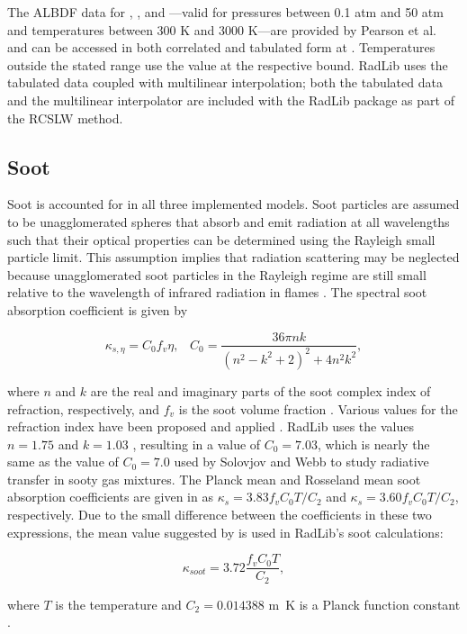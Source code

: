 \documentclass[preprint,12pt]{elsarticle}
\begin{document}
The ALBDF data for , , and ---valid for pressures between 0.1 atm and 50 atm and temperatures between 300 K and 3000 K---are provided by Pearson et al. \cite{Pearson_2014} and can be accessed in both correlated and tabulated form at \cite{Solovjov_2014b}. Temperatures outside the stated range use the value at the respective bound. RadLib uses the tabulated data coupled with multilinear interpolation; both the tabulated data and the multilinear interpolator are included with the RadLib package as part of the RCSLW method.


\subsection{Soot} \label{s:soot}

Soot is accounted for in all three implemented models. Soot particles are assumed to be unagglomerated spheres that absorb and emit radiation at all wavelengths such that their optical properties can be determined using the Rayleigh small particle limit. This assumption implies that radiation scattering may be neglected because unagglomerated soot particles in the Rayleigh regime are still small relative to the wavelength of infrared radiation in flames \cite{Brewster_1992,Solovjov_2001}. The spectral soot absorption coefficient is given by
%
\begin{linenomath}
\begin{equation}
\label{e:soot1}
\kappa_{s,\eta}=C_0 f_v \eta, \; \; \; C_0 = \frac{36\pi n k}{(n^2-k^2+2)^2+4n^2k^2},
\end{equation}
\end{linenomath}
%
where $n$ and $k$ are the real and imaginary parts of the soot complex index of refraction, respectively, and $f_v$ is the soot volume fraction \cite{Solovjov_2001,Modest_2013}. Various values for the refraction index have been proposed and applied \cite{Lee_1981,Stull_1960,Dalzell_1969,Howarth_1966,Chang_1990,Felske_1984,Williams_2007}.
RadLib uses the values $n=1.75$ and $k=1.03$ \cite{Williams_2007}, resulting in a value of $C_0=7.03$, which is nearly the same as the value of $C_0=7.0$ used by Solovjov and Webb \cite{Solovjov_2001} to study radiative transfer in sooty gas mixtures.
The Planck mean and Rosseland mean soot absorption coefficients are given in \cite{Modest_2013} as $\kappa_s=3.83f_vC_0T/C_2$ and $\kappa_s=3.60f_vC_0T/C_2$, respectively.
Due to the small difference between the coefficients in these two expressions, the mean value suggested by \cite{Modest_2013,Felske_1977} is used in RadLib's soot calculations:
%
\begin{linenomath}
\begin{equation} \label{e:soot2}
\kappa_{soot}=3.72\frac{f_vC_0T}{C_2},
\end{equation}
\end{linenomath}
%
where $T$ is the temperature and $C_2=0.014388$ \si{m.K} is a Planck function constant \cite{Modest_2013}.
\end{document}
